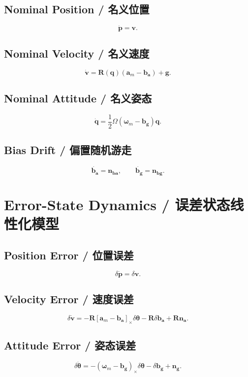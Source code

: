 \documentclass[12pt,a4paper]{ctexart} %
\begin{document}
\subsection{Nominal Position / 名义位置}
\[
\dot{\mathbf{p}} = \mathbf{v}.
\]

\subsection{Nominal Velocity / 名义速度}
\[
\dot{\mathbf{v}} = \mathbf{R}(\mathbf{q})(\mathbf{a}_m - \mathbf{b_a}) + \mathbf{g}.
\]

\subsection{Nominal Attitude / 名义姿态}
\[
\dot{\mathbf{q}} = \frac{1}{2} \Omega(\boldsymbol{\omega}_m - \mathbf{b_g}) \mathbf{q}.
\]

\subsection{Bias Drift / 偏置随机游走}
\[
\dot{\mathbf{b_a}} = \mathbf{n_{ba}},
\qquad
\dot{\mathbf{b_g}} = \mathbf{n_{bg}}.
\]

\section{Error-State Dynamics / 误差状态线性化模型}

\subsection{Position Error / 位置误差}
\[
\delta\dot{\mathbf{p}} = \delta\mathbf{v}.
\]

\subsection{Velocity Error / 速度误差}
\[
\delta \dot{\mathbf{v}} =
-\mathbf{R}[\mathbf{a}_m - \mathbf{b_a}]_\times \delta\boldsymbol{\theta}
-\mathbf{R}\delta\mathbf{b_a}
+ \mathbf{R}\mathbf{n_a}.
\]

\subsection{Attitude Error / 姿态误差}
\[
\delta \dot{\boldsymbol{\theta}} =
-(\boldsymbol{\omega}_m - \mathbf{b_g})_\times \delta\boldsymbol{\theta}
- \delta \mathbf{b_g}
+ \mathbf{n_g}.
\]
\end{document}
